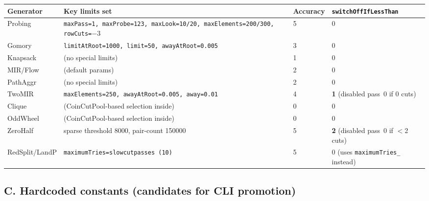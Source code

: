 \documentclass[11pt,a4paper]{article}
\begin{document}
\begin{longtable}{p{2.5cm}p{5.5cm}p{1.8cm}p{3.0cm}}
\toprule
\textbf{Generator} & \textbf{Key limits set} & \textbf{Accuracy} &
  \textbf{\texttt{switchOffIfLessThan}}\\
\midrule
\endhead
Probing & \texttt{maxPass=1, maxProbe=123, maxLook=10/20,
  maxElements=200/300, rowCuts=$-3$} & 5 & 0\\
Gomory  & \texttt{limitAtRoot=1000, limit=50, awayAtRoot=0.005}
  & 3 & 0\\
Knapsack & (no special limits) & 1 & 0\\
MIR/Flow & (default params) & 2 & 0\\
PathAggr & (no special limits) & 2 & 0\\
TwoMIR  & \texttt{maxElements=250, awayAtRoot=0.005, away=0.01}
  & 4 & \textbf{1} (disabled pass~0 if 0 cuts)\\
Clique  & (CoinCutPool-based selection inside) & 0 & 0\\
OddWheel& (CoinCutPool-based selection inside) & 0 & 0\\
ZeroHalf& sparse threshold 8000, pair-count 150000 & 5 &
  \textbf{2} (disabled pass~0 if $<$2 cuts)\\
RedSplit/LandP & \texttt{maximumTries=slowcutpasses (10)} & 5 &
  0 (uses \texttt{maximumTries\_} instead)\\
\bottomrule
\end{longtable}

\subsection*{C. Hardcoded constants (candidates for CLI promotion)}
\end{document}
